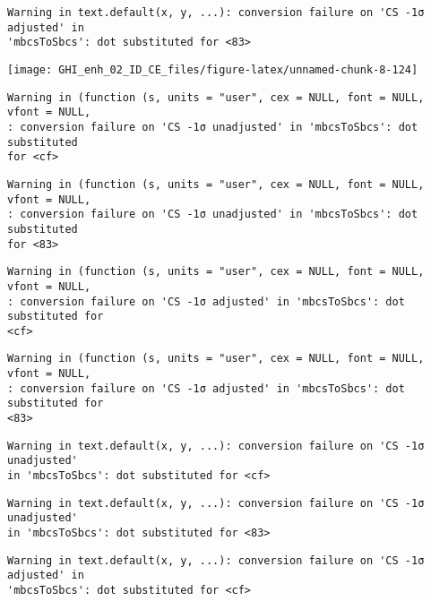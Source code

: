 \documentclass[
  10pt,
  a4paper,oneside]{article}
\begin{document}
\begin{verbatim}
Warning in text.default(x, y, ...): conversion failure on 'CS -1σ adjusted' in
'mbcsToSbcs': dot substituted for <83>
\end{verbatim}

\begin{center}\texttt{[image: GHI\_enh\_02\_ID\_CE\_files/figure-latex/unnamed-chunk-8-124]} \end{center}

\begin{verbatim}
Warning in (function (s, units = "user", cex = NULL, font = NULL, vfont = NULL,
: conversion failure on 'CS -1σ unadjusted' in 'mbcsToSbcs': dot substituted
for <cf>
\end{verbatim}

\begin{verbatim}
Warning in (function (s, units = "user", cex = NULL, font = NULL, vfont = NULL,
: conversion failure on 'CS -1σ unadjusted' in 'mbcsToSbcs': dot substituted
for <83>
\end{verbatim}

\begin{verbatim}
Warning in (function (s, units = "user", cex = NULL, font = NULL, vfont = NULL,
: conversion failure on 'CS -1σ adjusted' in 'mbcsToSbcs': dot substituted for
<cf>
\end{verbatim}

\begin{verbatim}
Warning in (function (s, units = "user", cex = NULL, font = NULL, vfont = NULL,
: conversion failure on 'CS -1σ adjusted' in 'mbcsToSbcs': dot substituted for
<83>
\end{verbatim}

\begin{verbatim}
Warning in text.default(x, y, ...): conversion failure on 'CS -1σ unadjusted'
in 'mbcsToSbcs': dot substituted for <cf>
\end{verbatim}

\begin{verbatim}
Warning in text.default(x, y, ...): conversion failure on 'CS -1σ unadjusted'
in 'mbcsToSbcs': dot substituted for <83>
\end{verbatim}

\begin{verbatim}
Warning in text.default(x, y, ...): conversion failure on 'CS -1σ adjusted' in
'mbcsToSbcs': dot substituted for <cf>
\end{verbatim}
\end{document}
